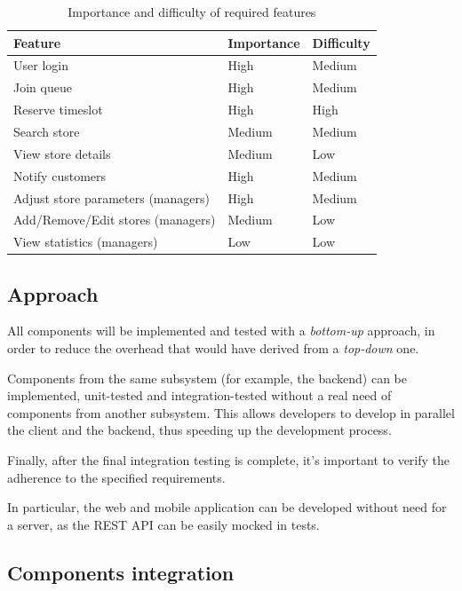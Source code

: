 \begin{table}[h]
    \centering
    \begin{tabular}[h]{|l|l|l|}
        \hline
        \textbf{Feature} & \textbf{Importance} & \textbf{Difficulty} \\\hline
        User login & High & Medium \\
        Join queue & High & Medium \\
        Reserve timeslot & High & High \\
        Search store & Medium & Medium \\
        View store details & Medium & Low \\
        Notify customers & High & Medium \\
        Adjust store parameters (managers) & High & Medium \\
        Add/Remove/Edit stores (managers) & Medium & Low \\
        View statistics (managers) & Low & Low \\
        \hline
    \end{tabular}
    \caption{Importance and difficulty of required features}
    \label{tab:features}
\end{table}

\subsection{Approach}

All components will be implemented and tested with a \emph{bottom-up} approach, in order to reduce the overhead that would have derived from a \emph{top-down} one.

Components from the same subsystem (for example, the backend) can be implemented, unit-tested and integration-tested without a real need of components from another subsystem. This allows developers to develop in parallel the client and the backend, thus speeding up the development process.

Finally, after the final integration testing is complete, it's important to verify the adherence to the specified requirements.

In particular, the web and mobile application can be developed without need for a server, as the REST API can be easily mocked in tests.

\subsection{Components integration}

